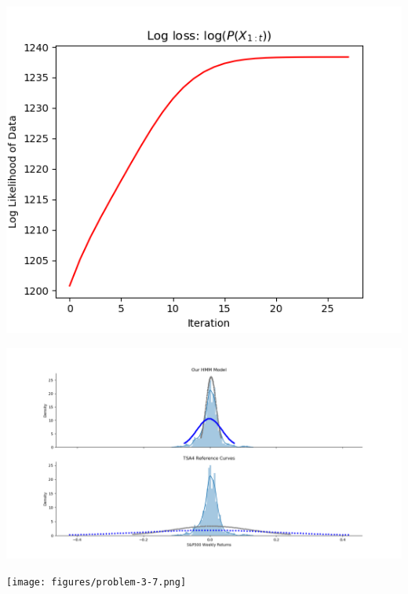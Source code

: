 \documentclass[12pt]{article}
\begin{document}
\begin{center}
	\includegraphics[width=1\linewidth]{figures/problem-3-5.png} 
\end{center}

\begin{center}
	\includegraphics[width=1\linewidth]{figures/problem-3-6.png} 
\end{center}

\begin{center}
	\texttt{[image: figures/problem-3-7.png]} 
\end{center}
\end{document}
